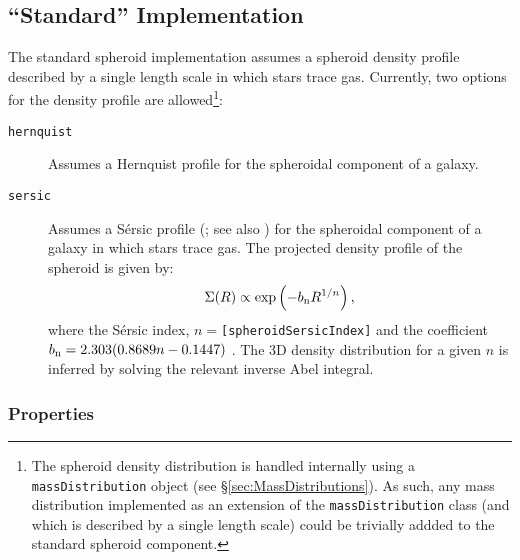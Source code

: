 \subsection{``Standard'' Implementation}

The standard spheroid implementation assumes a spheroid density profile described by a single length scale in which stars trace gas. Currently, two options for the density profile are allowed\footnote{The spheroid density distribution is handled internally using a {\tt massDistribution} object (see \S\ref{sec:MassDistributions}). As such, any mass distribution implemented as an extension of the {\tt massDistribution} class (and which is described by a single length scale) could be trivially addded to the standard spheroid component.}:
\begin{description}
\item [{\tt hernquist}] Assumes a Hernquist profile \citep{hernquist_analytical_1990} for the spheroidal \gls{component} of a galaxy.
\item [{\tt sersic}] Assumes a S\'ersic profile (\citealt{sersic_influence_1963}; see also \citealt{mazure_exact_2002}) for the spheroidal \gls{component} of a galaxy in which stars trace gas. The projected density profile of the spheroid is given by:
\begin{equation}
 \Sigma(R) \propto \exp\left(-b_{\rm n} R^{1/n} \right),
\end{equation}
where the S\'ersic index, $n=${\tt [spheroidSersicIndex]} and the coefficient $b_{\rm n}=2.303(0.8689 n-0.1447)$ \cite{wadadekar_two-dimensional_1999}. The 3D density distribution for a given $n$ is inferred by solving the relevant inverse Abel integral.
\end{description}

\subsubsection{Properties}


